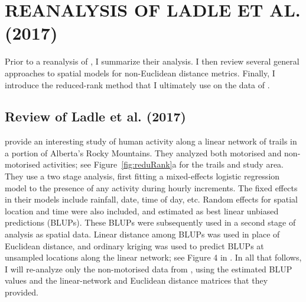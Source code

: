 \section*{REANALYSIS OF LADLE ET AL. (2017)}

Prior to a reanalysis of \citet{Ladl:Avga:Whea:Boyc:pred:2016}, I summarize their analysis.  I then review several general approaches to spatial models for non-Euclidean distance metrics. Finally, I introduce the reduced-rank method that I ultimately use on the data of \citet{Ladl:Avga:Whea:Boyc:pred:2016}.

\subsection*{Review of Ladle et al. (2017)}

\citet{Ladl:Avga:Whea:Boyc:pred:2016} provide an interesting study of human activity along a linear network of trails in a portion of Alberta's Rocky Mountains.  They analyzed both motorised and non-motorised activities; see Figure~\ref{fig:reduRank}a for the trails and study area.  They use a two stage analysis, first fitting a mixed-effects logistic regression model to the presence of any activity during hourly increments.  The fixed effects in their models include rainfall, date, time of day, etc.  Random effects for spatial location and time were also included, and estimated as best linear unbiased predictions (BLUPs). These BLUPs were subsequently used in a second stage of analysis as spatial data.  Linear distance among BLUPs was used in place of Euclidean distance, and ordinary kriging was used to predict BLUPs at unsampled locations along the linear network; see Figure 4 in \citet{Ladl:Avga:Whea:Boyc:pred:2016}. In all that follows, I will re-analyze only the non-motorised data from \citet{Ladl:Avga:Whea:Boyc:pred:2016}, using the estimated BLUP values and the linear-network and Euclidean distance matrices that they provided. 

